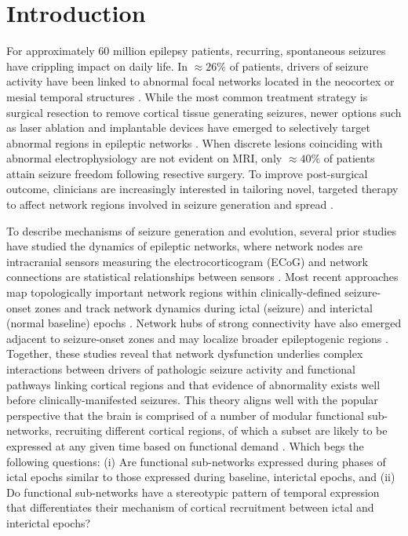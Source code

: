 \section{Introduction}
For approximately 60 million epilepsy patients, recurring, spontaneous seizures have crippling impact on daily life. In $\approx26\%$ of patients, drivers of seizure activity have been linked to abnormal focal networks located in the neocortex or mesial temporal structures \cite{siegel2001medically}. While the most common treatment strategy is surgical resection to remove cortical tissue generating seizures, newer options such as laser ablation and implantable devices have emerged to selectively target abnormal regions in epileptic networks \cite{fisher2010electrical, morrell2011responsive, tovar-spinoza2013use, medvid2015current}. When discrete lesions coinciding with abnormal electrophysiology are not evident on MRI, only $\approx40\%$ of patients attain seizure freedom following resective surgery. To improve post-surgical outcome, clinicians are increasingly interested in tailoring novel, targeted therapy to affect network regions involved in seizure generation and spread \cite{kutsy1999ictal}. 

To describe mechanisms of seizure generation and evolution, several prior studies have studied the dynamics of epileptic networks, where network nodes are intracranial sensors measuring the electrocorticogram (ECoG) and network connections are statistical relationships between sensors \cite{friston2011functional, hutchison2013dynamic}. Most recent approaches map topologically important network regions within clinically-defined seizure-onset zones and track network dynamics during ictal (seizure) and interictal (normal baseline) epochs \cite{wendling2003epileptic, jerger2005multivariate, schindler2006assessing, schindler2008evolving, kramer2010coalescence, jiruska2012synchronization, burns2014network}. Network hubs of strong connectivity have also emerged adjacent to seizure-onset zones and may localize broader epileptogenic regions \cite{schevon2007cortical, zaveri2009localization-related, rummel2013systems-level, weiss2013ictal, geier2015how}. Together, these studies reveal that network dysfunction underlies complex interactions between drivers of pathologic seizure activity and functional pathways linking cortical regions and that evidence of abnormality exists well before clinically-manifested seizures. This theory aligns well with the popular perspective that the brain is comprised of a number of modular functional sub-networks, recruiting different cortical regions, of which a subset are likely to be expressed at any given time based on functional demand \cite{deco2011dynamical, deco2011emerging, hansen2015functional}. Which begs the following questions: (i) Are functional sub-networks expressed during phases of ictal epochs similar to those expressed during baseline, interictal epochs, and (ii) Do functional sub-networks have a stereotypic pattern of temporal expression that differentiates their mechanism of cortical recruitment between ictal and interictal epochs?
 
